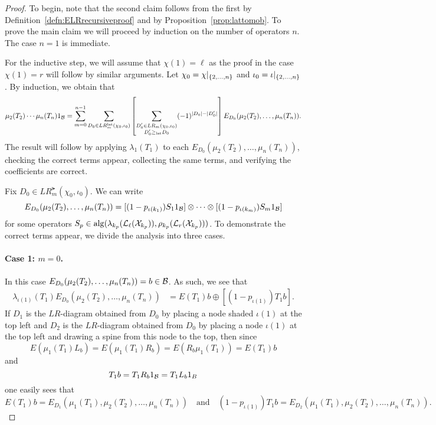 		\begin{proof}
			To begin, note that the second claim follows from the first by Definition~\ref{defn:ELRrecursiveproof} and by Proposition~\ref{prop:lattomob}.
			To prove the main claim we will proceed by induction on the number of operators $n$.
			The case $n = 1$ is immediate.

			For the inductive step, we will assume that $\chi(1) = \ell$ as the proof in the case $\chi(1) = r$ will follow by similar arguments. Let $\chi_0 = \chi|_{\left\{2,\ldots, n\right\}}$ and $\iota_0 = \iota|_{\left\{2,\ldots, n\right\}}$.
			By induction, we obtain that
			\[
				\mu_2(T_2) \cdots \mu_n(T_n)1_{\mathcal{B}} = \sum_{m=0}^{n-1} \sum_{D_0 \in LR^{\operatorname{lat}}_m(\chi_0, \iota_0)} \left[ \sum_{\substack{ D'_0 \in LR_m(\chi_0, \iota_0) \\ D'_0 \geq_{\mathrm{lat}} D_0}} (-1)^{|D_0| - |D'_0|}
				\right] E_{D_0}(\mu_2(T_2),\ldots, \mu_n(T_n)).
			\]
			The result will follow by applying $\lambda_1(T_1)$ to each $E_{D_0}(\mu_2(T_2),\ldots, \mu_n(T_n))$, checking the correct terms appear, collecting the same terms, and verifying the coefficients are correct.


			Fix $D_0 \in LR^\lat_m(\chi_0, \iota_0)$.
			We can write
			\[
				E_{D_0}(\mu_2(T_2),\ldots, \mu_n(T_n)) = [(1-p_{\iota(k_{1})}) S_1 1_{\mathcal{B}}] \otimes \cdots \otimes [(1-p_{\iota(k_{m})}) S_m1_{\mathcal{B}}]
			\]
			for some operators $S_p \in \mathrm{alg}(\lambda_{k_p}(\mathcal{L}_\ell(\mathcal{X}_{k_p})), \rho_{k_p}(\mathcal{L}_r(\mathcal{X}_{k_p})))$.
			To demonstrate the correct terms appear, we divide the analysis into three cases.













			\paragraph{Case 1: $m = 0$.}
			In this case $E_{D_0}(\mu_2(T_2),\ldots, \mu_n(T_n)) = b \in \mathcal{B}$.
			As such, we see that
			\begin{align*}
				\lambda_{\iota(1)}(T_1)E_{D_0}(\mu_2(T_2),\ldots, \mu_n(T_n)) & = E(T_1)b \oplus [(1-p_{\iota(1)})T_1 b].
			\end{align*}
			If $D_1$ is the $LR$-diagram obtained from $D_0$ by placing a node shaded $\iota(1)$ at the top left and $D_2$ is the $LR$-diagram obtained from $D_0$ by placing a node $\iota(1)$ at the top left and drawing a spine from this node to the top, then since 
			\[
				E(\mu_1(T_1) L_b) = E(\mu_1(T_1) R_b) = E(R_b \mu_1(T_1)) = E(T_1) b
			\]
			and
			\[
				T_1 b = T_1 R_b 1_{\mathcal{B}} = T_1 L_b 1_B
			\]
			one easily sees that 
			\[
				E(T_1)b = E_{D_1}(\mu_1(T_1), \mu_2(T_2),\ldots, \mu_n(T_n)) \quad \text{and} \quad (1-p_{\iota(1)})T_1 b = E_{D_2}(\mu_1(T_1), \mu_2(T_2),\ldots, \mu_n(T_n)).
			\]







\end{proof}
